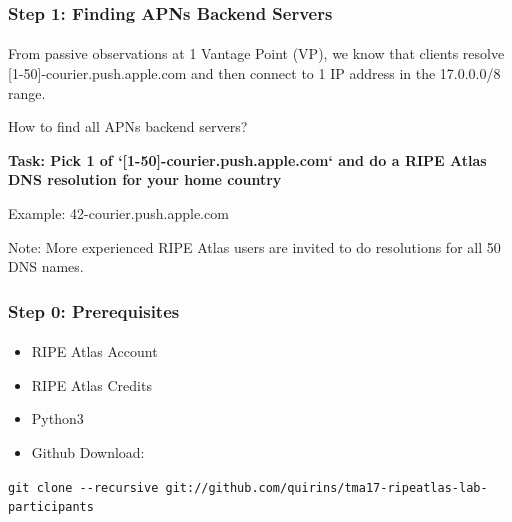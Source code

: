 
\begin{frame}
\frametitle{Step 1: Finding APNs Backend Servers}
\framesubtitle{}

From passive observations at 1 Vantage Point (VP), we know that clients resolve [1-50]-courier.push.apple.com and then connect to 1 IP address in the 17.0.0.0/8 range.

How to find all APNs backend servers?
\pause

\textbf{Task: Pick 1 of `[1-50]-courier.push.apple.com` and do a RIPE Atlas DNS resolution for your home country}

Example: 42-courier.push.apple.com

Note: More experienced RIPE Atlas users are invited to do resolutions for all 50 DNS names.

\end{frame}
\clearpage
\begin{frame}
\frametitle{Step 0: Prerequisites}
\framesubtitle{}
\begin{itemize}
	\item RIPE Atlas Account
	\item RIPE Atlas Credits
	\item Python3
	\item Github Download:
\end{itemize}

\texttt{git clone -{}-recursive git://github.com/quirins/tma17-ripeatlas-lab-participants}

\end{frame}
\clearpage

